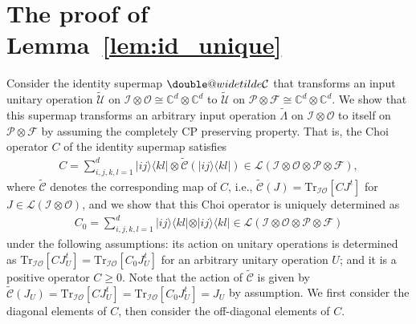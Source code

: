 \documentclass[a4paper,twocolumn,accepted=2022-10-23]{quantumarticle}
\makeatletter
\newcommand{\ketbra}[2]{\vert {#1} \rangle\!\langle {#2} \vert}
\newcommand{\Tr}[0]{{\mathrm{Tr}}}
\newcommand{\fcal}[0]{{\mathcal{F}}}
\newcommand{\ical}[0]{{\mathcal{I}}}
\newcommand{\ocal}[0]{{\mathcal{O}}}
\newcommand{\pcal}[0]{{\mathcal{P}}}
\newcommand{\lcal}[0]{{\mathcal{L}}}
\newcommand{\doublewidetilde}[1]{{%
  \mathpalette\double@widetilde{#1}%
}}
\newcommand{\double@widetilde}[2]{%
  \sbox\z@{$\m@th#1\widetilde{#2}$}%
  \ht\z@=.9\ht\z@
  \widetilde{\box\z@}%
}
\newcommand{\ttsmap}[1]{\doublewidetilde{\mbox{$\mathcal{#1}$}}}
\newcommand{\tmap}[1]{\widetilde{\mbox{$\mathcal{#1}$}}}
\newcommand{\tmapf}[1]{\widetilde{\mbox{$#1$}}}
\theoremstyle{definition}
\makeatother
\begin{document}
\section{The proof of Lemma~\ref{lem:id_unique}}\label{ap:proof_id}

Consider the identity supermap $\ttsmap{C}$ that transforms an input unitary operation
$\tmap{U}$ on $\ical \otimes \ocal \cong \mathbb{C}^d \otimes \mathbb{C}^d$ to
$\tmap{U}$ on $\pcal \otimes \fcal \cong \mathbb{C}^d \otimes \mathbb{C}^d$.
We show that this supermap transforms an arbitrary input operation $\tmapf{\Lambda}$ on $\ical \otimes \ocal$ to itself on $\pcal \otimes \fcal$
by assuming the completely CP preserving property.
That is, the Choi operator $C$ of the identity supermap satisfies
\begin{align}
C = \sum_{i,j,k,l=1}^d \ketbra{ij}{kl} \otimes \tmap{C}(\ketbra{ij}{kl}) \in \lcal( \ical \otimes \ocal \otimes \pcal \otimes \fcal),
\end{align}
where $\tmap{C}$ denotes the corresponding map of $C$, i.e., $\tmap{C}(J) = \Tr_{\ical \ocal} [C J^t]$ for $J \in \lcal (\ical \otimes \ocal)$,
and we show that this Choi operator is uniquely determined as
\begin{align}
C_0 = \sum_{i,j,k,l=1}^d \ketbra{ij}{kl} \otimes \ketbra{ij}{kl} \in \lcal( \ical \otimes \ocal \otimes \pcal \otimes \fcal)
\end{align}
under the following assumptions:
its action on unitary operations is determined as $\Tr_{\ical \ocal} [ C J_U^t ] = \Tr_{\ical \ocal} [ C_0 J_U^t ]$ for an arbitrary unitary operation $U$;
and it is a positive operator $C \geq 0$.
Note that the action of $\tmap{C}$ is given by $\tmap{C}(J_U) = \Tr_{\ical \ocal} [C J_U^t] = \Tr_{\ical \ocal} [ C_0 J_U^t ] = J_U$ by assumption.
We first consider the diagonal elements of $C$, then consider the off-diagonal elements of $C$.
\end{document}
